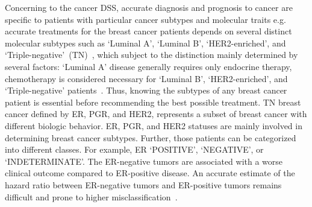 \hspace*{3.5mm} Concerning to the cancer DSS, accurate diagnosis and prognosis to cancer are specific to patients with particular cancer subtypes and molecular traits e.g. accurate treatments for the breast cancer patients depends on several distinct molecular subtypes such as `Luminal A', `Luminal B', `HER2-enriched', and `Triple-negative'~(TN)~\cite{sorlie,dai}, which subject to the distinction mainly determined by several factors: `Luminal A' disease generally requires only endocrine therapy, chemotherapy is considered necessary for `Luminal B', `HER2-enriched', and `Triple-negative' patients~\cite{goldhirsch}. Thus, knowing the subtypes of any breast cancer patient is essential before recommending the best possible treatment. 
TN breast cancer defined by ER, PGR, and HER2, represents a subset of breast cancer with different biologic behavior. ER, PGR, and HER2 statuses are mainly involved in determining breast cancer subtypes. %
Further, those patients can be categorized into different classes. For example, ER `POSITIVE', `NEGATIVE', or `INDETERMINATE'. The ER-negative tumors are associated with a worse clinical outcome compared to ER-positive disease. An accurate estimate of the hazard ratio between ER-negative tumors and ER-positive tumors remains difficult and prone to higher misclassification~\cite{karimACCA2019}. 

